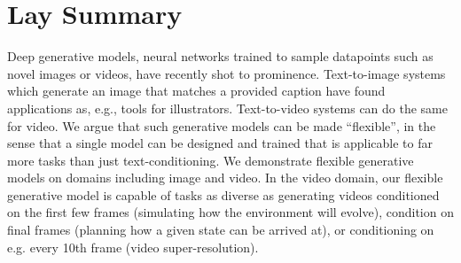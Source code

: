 

\chapter{Lay Summary}

Deep generative models, neural networks trained to sample datapoints such as novel images or videos, have recently shot to prominence. Text-to-image systems which generate an image that matches a provided caption have found applications as, e.g., tools for illustrators. Text-to-video systems can do the same for video. We argue that such generative models can be made ``flexible'', in the sense that a single model can be designed and trained that is applicable to far more tasks than just text-conditioning. We demonstrate flexible generative models on domains including image and video. In the video domain, our flexible generative model is capable of tasks as diverse as generating videos conditioned on the first few frames (simulating how the environment will evolve), condition on final frames (planning how a given state can be arrived at), or conditioning on e.g. every 10th frame (video super-resolution).



\endinput

